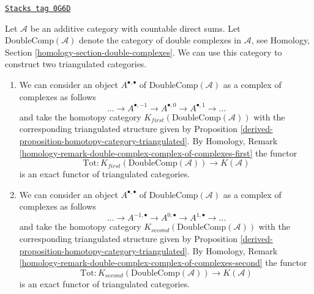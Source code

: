\begin{remark}
\label{derived-remark-homotopy-double}
\href{https://stacks.math.columbia.edu/tag/0G6D}{\texttt{Stacks tag 0G6D}}

Let $\mathcal{A}$ be an additive category with countable direct sums.
Let $\text{DoubleComp}(\mathcal{A})$ denote the category of double complexes
in $\mathcal{A}$, see
Homology, Section \ref{homology-section-double-complexes}.
We can use this category to construct two triangulated categories.
\begin{enumerate}
\item We can consider an object $A^{\bullet, \bullet}$ of
$\text{DoubleComp}(\mathcal{A})$ as a complex of complexes
as follows
$$
\ldots \to A^{\bullet, -1} \to A^{\bullet, 0} \to A^{\bullet, 1} \to \ldots
$$
and take the homotopy category $K_{first}(\text{DoubleComp}(\mathcal{A}))$
with the corresponding triangulated structure given by
Proposition \ref{derived-proposition-homotopy-category-triangulated}.
By Homology, Remark
\ref{homology-remark-double-complex-complex-of-complexes-first} the functor
$$
\text{Tot} :
K_{first}(\text{DoubleComp}(\mathcal{A}))
\longrightarrow
K(\mathcal{A})
$$
is an exact functor of triangulated categories.
\item We can consider an object $A^{\bullet, \bullet}$ of
$\text{DoubleComp}(\mathcal{A})$ as a complex of complexes
as follows
$$
\ldots \to A^{-1, \bullet} \to A^{0, \bullet} \to A^{1, \bullet} \to \ldots
$$
and take the homotopy category $K_{second}(\text{DoubleComp}(\mathcal{A}))$
with the corresponding triangulated structure given by
Proposition \ref{derived-proposition-homotopy-category-triangulated}.
By Homology, Remark
\ref{homology-remark-double-complex-complex-of-complexes-second} the functor
$$
\text{Tot} :
K_{second}(\text{DoubleComp}(\mathcal{A}))
\longrightarrow
K(\mathcal{A})
$$
is an exact functor of triangulated categories.
\end{enumerate}
\end{remark}


